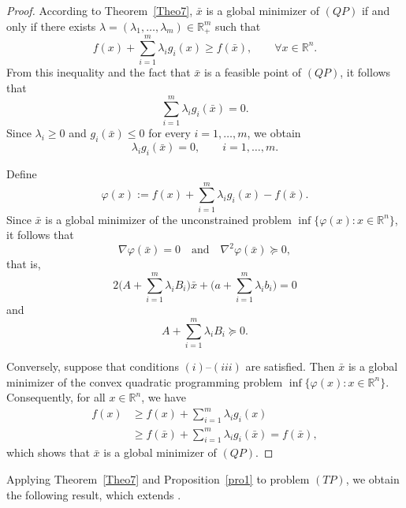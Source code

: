 \documentclass[]{interact}
\theoremstyle{plain}%
\theoremstyle{definition}
\theoremstyle{remark}
\begin{document}
	\begin{proof}
		According to Theorem~\ref{Theo7}, $\bar x$ is a global minimizer of $(QP)$ if and only if there exists
		$\lambda=(\lambda_1,\ldots,\lambda_m)\in \mathbb{R}^m_+$ such that
		\begin{equation}\label{e12}
			f(x)+\sum_{i=1}^{m}\lambda_i g_i(x)\geq f(\bar x), \qquad \forall x\in \mathbb{R}^n.
		\end{equation}
		From this inequality and the fact that $\bar x$ is a feasible point of $(QP)$, it follows that
		\begin{equation}\label{e13}
			\sum_{i=1}^{m}\lambda_i g_i(\bar x)=0.
		\end{equation}
		Since $\lambda_i\geq 0$ and $g_i(\bar x)\leq 0$ for every $i=1,\ldots,m$, we obtain
		\begin{equation}\label{e14}
			\lambda_i g_i(\bar x)=0, \qquad i=1,\ldots,m.
		\end{equation}
		
		Define
		$$\varphi(x):=f(x)+\sum_{i=1}^{m}\lambda_i g_i(x)-f(\bar x).$$
		Since $\bar x$ is a global minimizer of the unconstrained problem
		$\inf\{\varphi(x): x\in \mathbb{R}^n\}$, it follows that
		$$\nabla \varphi(\bar x)=0
		\quad \text{and} \quad
		\nabla^2 \varphi(\bar x)\succeq 0,$$
		that is,
		$$2\bigg(A+\sum_{i=1}^{m}\lambda_i B_i\bigg)\bar x
		+\bigg(a+\sum_{i=1}^{m}\lambda_i b_i\bigg)=0$$
		and
		$$A+\sum_{i=1}^{m}\lambda_i B_i\succeq 0.$$
		
		Conversely, suppose that conditions $(i)$--$(iii)$ are satisfied.
		Then $\bar x$ is a global minimizer of the convex quadratic programming problem
		$\inf\{\varphi(x): x\in \mathbb{R}^n\}$.
		Consequently, for all $x\in \mathbb{R}^n$, we have
		\begin{align*}
			f(x)
			&\geq f(x)+\sum_{i=1}^{m}\lambda_i g_i(x) \\
			&\geq f(\bar x)+\sum_{i=1}^{m}\lambda_i g_i(\bar x)
			= f(\bar x),
		\end{align*}
		which shows that $\bar x$ is a global minimizer of $(QP)$.
	\end{proof}
	
	
	
	Applying Theorem~\ref{Theo7} and Proposition~\ref{pro1} to problem $(TP)$,
	we obtain the following result, which extends
	\cite[Theorem~4.1 and Corollary~4.1]{JeyakumarLi2014}.
	
\end{document}
